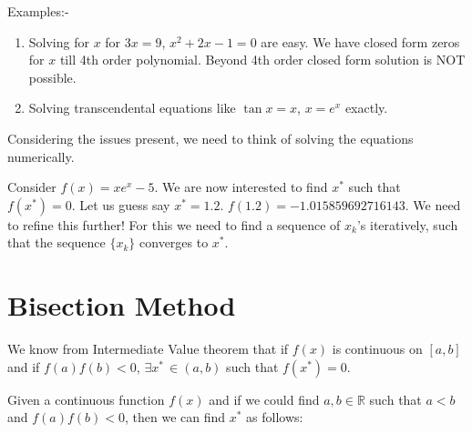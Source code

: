 \documentclass[
]{book}
\begin{document}
Examples:-

\begin{enumerate}
\def\labelenumi{\arabic{enumi}.}
\item
  Solving for \(x\) for \(3x=9\), \(x^2+2x-1=0\) are easy. We have closed form zeros for \(x\) till 4th order polynomial. Beyond 4th order closed form solution is NOT possible.
\item
  Solving transcendental equations like \(\tan x = x\), \(x=e^x\) exactly.
\end{enumerate}

Considering the issues present, we need to think of solving the equations numerically.

Consider \(f(x) = xe^x-5\). We are now interested to find \(x^*\) such that \(f(x^*)=0\). Let us guess say \(x^*=1.2\). \(f(1.2) = -1.015859692716143\). We need to refine this further! For this we need to find a sequence of \(x_k\)'s iteratively, such that the sequence \(\{x_k\}\) converges to \(x^*\).

\hypertarget{bisection-method}{%
\section{Bisection Method}\label{bisection-method}}

We know from Intermediate Value theorem that if \(f(x)\) is continuous on \([a,b]\) and if \(f(a) f(b)<0\), \(\exists x^* \, \in(a,b)\) such that \(f(x^*)=0\).

Given a continuous function \(f(x)\) and if we could find \(a,b\in \mathbb{R}\) such that \(a<b\) and \(f(a) f(b)<0\), then we can find \(x^*\) as follows:
\end{document}
